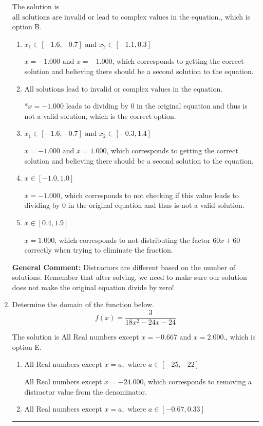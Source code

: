 \documentclass{extbook}[14pt]
\newcommand{\litem}[1]{\item #1

\rule{\textwidth}{0.4pt}}
\begin{document}
\begin{enumerate}
{The solution is \( \text{all solutions are invalid or lead to complex values in the equation.} \), which is option B.\begin{enumerate}[label=\Alph*.]
\item \( x_1 \in [-1.6, -0.7] \text{ and } x_2 \in [-1.1,0.3] \)

$x = -1.000 \text{ and } x = -1.000$, which corresponds to getting the correct solution and believing there should be a second solution to the equation.
\item \( \text{All solutions lead to invalid or complex values in the equation.} \)

*$x = -1.000$ leads to dividing by 0 in the original equation and thus is not a valid solution, which is the correct option.
\item \( x_1 \in [-1.6, -0.7] \text{ and } x_2 \in [-0.3,1.4] \)

$x = -1.000 \text{ and } x = 1.000$, which corresponds to getting the correct solution and believing there should be a second solution to the equation.
\item \( x \in [-1.0,1.0] \)

$x = -1.000$, which corresponds to not checking if this value leads to dividing by 0 in the original equation and thus is not a valid solution.
\item \( x \in [0.4,1.9] \)

$x = 1.000$, which corresponds to not distributing the factor $60x + 60$ correctly when trying to eliminate the fraction.
\end{enumerate}

\textbf{General Comment:} Distractors are different based on the number of solutions. Remember that after solving, we need to make sure our solution does not make the original equation divide by zero!
}
\litem{
Determine the domain of the function below.
\[ f(x) = \frac{3}{18x^{2} -24 x -24} \]

The solution is \( \text{All Real numbers except } x = -0.667 \text{ and } x = 2.000. \), which is option E.\begin{enumerate}[label=\Alph*.]
\item \( \text{All Real numbers except } x = a, \text{ where } a \in [-25, -22] \)

All Real numbers except $x = -24.000$, which corresponds to removing a distractor value from the denominator.
\item \( \text{All Real numbers except } x = a, \text{ where } a \in [-0.67, 0.33] \)


\end{enumerate}}
\end{enumerate}
\end{document}
